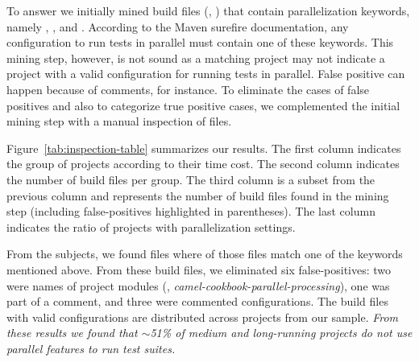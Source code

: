 To answer \numRQC{} we initially mined build files (\ie, \pomf{}) that
contain parallelization keywords, namely ,
, and .  According to the Maven
surefire documentation, any configuration to
run tests in parallel must contain one of these keywords. This mining
step, however, is not sound as a matching project may not indicate a
project with a valid configuration for running tests in parallel.
False positive can happen because of comments, for instance.  To
eliminate the cases of false positives and also to categorize true
positive cases, we complemented the initial mining step with a manual
inspection of files.


Figure~\ref{tab:inspection-table} summarizes our results. The first
column indicates the group of projects according to their time cost.
The second column indicates the number of build files per group.  The
third column is a subset from the previous column and represents the
number of build files found in the mining step (including
false-positives highlighted in parentheses). The last column indicates
the ratio of projects with parallelization settings.

From the \numMedLong{} subjects, we found \pomMedLong{} \pomf{} files
where \numPomMatched{} of those files match one of the keywords
mentioned above.  From these \numPomMatched{} build files, we
eliminated six false-positives: two were names of project modules
(\eg, \emph{camel-cookbook-parallel-processing}), one was part of a
comment, and three were commented configurations. The
\numPomMatchedValid{} build files with valid configurations are
distributed across \numProjectsPar{} projects from our sample.
\emph{From these results we found that $\sim$51\% of medium and
long-running projects do not use parallel features to run test
suites.}


